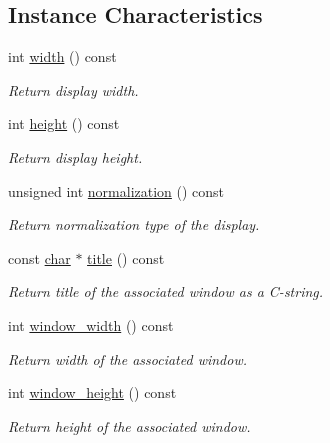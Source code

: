 \subsection*{Instance Characteristics}
\begin{DoxyCompactItemize}
\item 
int \hyperlink{structcimg__library__suffixed_1_1CImgDisplay_a7b08f09ace9b615eee0ff19846c4b6f8}{width} () const
\begin{DoxyCompactList}\small\item\em Return display width. \end{DoxyCompactList}\item 
int \hyperlink{structcimg__library__suffixed_1_1CImgDisplay_a5604a6886d51d1070ed2ddc568a848f2}{height} () const
\begin{DoxyCompactList}\small\item\em Return display height. \end{DoxyCompactList}\item 
unsigned int \hyperlink{structcimg__library__suffixed_1_1CImgDisplay_a79b6f929fe4aaf411051fc85862191a7}{normalization} () const
\begin{DoxyCompactList}\small\item\em Return normalization type of the display. \end{DoxyCompactList}\item 
const \hyperlink{classchar}{char} $\ast$ \hyperlink{structcimg__library__suffixed_1_1CImgDisplay_aec4c62a5a049354df77d22f6fe91e95c}{title} () const
\begin{DoxyCompactList}\small\item\em Return title of the associated window as a C-\/string. \end{DoxyCompactList}\item 
int \hyperlink{structcimg__library__suffixed_1_1CImgDisplay_a7adf8a88e9cf55f7f394801df0a0e555}{window\+\_\+width} () const
\begin{DoxyCompactList}\small\item\em Return width of the associated window. \end{DoxyCompactList}\item 
int \hyperlink{structcimg__library__suffixed_1_1CImgDisplay_a3a9370e8b4fd2d50de38bdb5ac1a3ede}{window\+\_\+height} () const
\begin{DoxyCompactList}\small\item\em Return height of the associated window. \end{DoxyCompactList}\item 

\end{DoxyCompactItemize}
